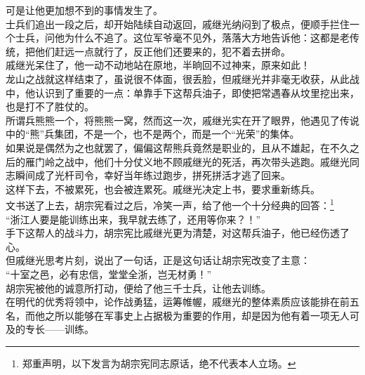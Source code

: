 \begin{multicols}{\theparacolNo}
可是让他更加想不到的事情发生了。\\

士兵们追出一段之后，却开始陆续自动返回，戚继光纳闷到了极点，便顺手拦住一个士兵，问他为什么不追了。这位军爷毫不见外，落落大方地告诉他：这都是老传统，把他们赶远一点就行了，反正他们还要来的，犯不着去拼命。\\

戚继光呆住了，他一动不动地站在原地，半晌回不过神来，原来如此！\\

龙山之战就这样结束了，虽说很不体面，很丢脸，但戚继光并非毫无收获，从此战中，他认识到了重要的一点：单靠手下这帮兵油子，即使把常遇春从坟里挖出来，也是打不了胜仗的。\\

所谓兵熊熊一个，将熊熊一窝，然而这一次，戚继光实在开了眼界，他遇见了传说中的“熊”兵集团，不是一个，也不是两个，而是一个“光荣”的集体。\\

如果说是偶然为之也就罢了，偏偏这帮熊兵竟然是职业的，且从不雄起，在不久之后的雁门岭之战中，他们十分仗义地不顾戚继光的死活，再次带头逃跑。戚继光同志瞬间成了光杆司令，幸好当年练过跑步，拼死拼活才逃了回来。\\

这样下去，不被累死，也会被连累死。戚继光决定上书，要求重新练兵。\\

文书送了上去，胡宗宪看过之后，冷笑一声，给了他一个十分经典的回答：\footnote{郑重声明，以下发言为胡宗宪同志原话，绝不代表本人立场。}\\

“浙江人要是能训练出来，我早就去练了，还用等你来？！”\\

手下这帮人的战斗力，胡宗宪比戚继光更为清楚，对这帮兵油子，他已经伤透了心。\\

但戚继光思考片刻，说出了一句话，正是这句话让胡宗宪改变了主意：\\

“十室之邑，必有忠信，堂堂全浙，岂无材勇！”\\

胡宗宪被他的诚意所打动，便给了他三千士兵，让他去训练。\\

在明代的优秀将领中，论作战勇猛，运筹帷幄，戚继光的整体素质应该能排在前五名，而他之所以能够在军事史上占据极为重要的作用，却是因为他有着一项无人可及的专长——训练。\\


\end{multicols}
